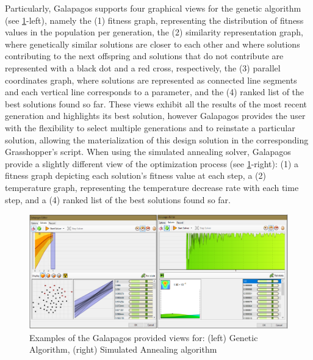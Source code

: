 	Particularly, Galapagos supports four graphical views for the genetic algorithm (see \cref{fig:galapagosvisualmenu}-left), namely the (1) fitness graph, representing the distribution of fitness values in the population per generation, the (2) similarity representation graph, where genetically similar solutions are closer to each other and where solutions contributing to the next offspring and solutions that do not contribute are represented with a black dot and a red cross, respectively, the (3) parallel coordinates graph, where solutions are represented as connected line segments and each vertical line corresponds to a parameter, and the (4) ranked list of the best solutions found so far. These views exhibit all the results of the most recent generation and highlights its best solution, however Galapagos provides the user with the flexibility to select multiple generations and to reinstate a particular solution, allowing the materialization of this design solution in the corresponding Grasshopper's script. When using the simulated annealing solver, Galapagos provide a slightly different view of the optimization process (see \cref{fig:galapagosvisualmenu}-right): (1) a fitness graph depicting each solution's fitness value at each step, a (2) temperature graph, representing the temperature decrease rate with each time step, and a (4) ranked list of the best solutions found so far.
	
\begin{figure}
\centering
\includegraphics[width=\textwidth]{Images/Background/Galapagos/galapagos-results.PNG}
\caption[Galapagos optimization results view]{Examples of the Galapagos provided views for: (left) Genetic Algorithm, (right) Simulated Annealing algorithm}
\label{fig:galapagosvisualmenu}
\end{figure}

